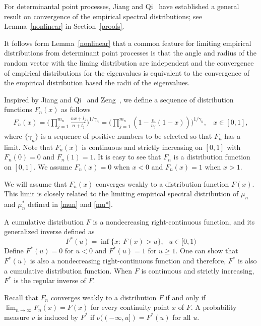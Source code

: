 \documentclass[11pt]{article}
\numberwithin{equation}{section}
\begin{document}
For determinantal point processes, Jiang and Qi~\cite{JiangQi2019}
have established a general result on convergence of the empirical
spectral distributions; see Lemma~\ref{nonlinear} in
Section~\ref{proofs}.

It follows form Lemma~\ref{nonlinear} that a common feature for
limiting empirical distributions from determinant point processes is
that the angle and radius of the random vector with the liming
distribution are independent and the convergence of empirical
distributions for the eigenvalues is equivalent to the convergence
of the empirical distribution based the radii of the eigenvalues.

Inspired by Jiang and Qi~\cite{JiangQi2019} and
Zeng~\cite{Zeng2017}, we define a sequence of distribution functions
$F_n(x)$ as follows
\begin{eqnarray}\label{Fn}
    F_{n}(x)=\Big(\prod_{j=1}^{m_n} \frac{nx+l_{j} }{n+l_{j}}\Big)^{1 / \gamma_{n}}=
    \Big(\prod_{j=1}^{m_n} (1-\frac{n}{n_j}(1-x))\Big) ^{1 /\gamma_{n}},~~~~  x
\in[0,1],
\end{eqnarray}
where $\{\gamma_n\}$ is a sequence of positive numbers to be
selected so that $F_n$ has a limit. Note that $F_n(x)$ is continuous
and strictly increasing on $[0,1]$ with $F_{n}(0)=0$ and
$F_{n}(1)=1$. It is easy to see that $F_n$ is a distribution
function on $[0,1]$.  We assume $F_n(x)=0$ when $x<0$ and $F_n(x)=1$
when $x>1$.

We will assume that $F_n(x)$ converges weakly to a distribution
function $F(x)$. This limit is closely related to the limiting
empirical spectral distribution of $\mu_n$ and $\mu_n^*$ defined in
\eqref{mun} and \eqref{mu*}.


A cumulative distribution $F$ is a nondecreasing right-continuous
function, and its generalized inverse defined as
\begin{equation}\label{G-inverse}
F^*(u)=\inf\{x:~ F(x)>u\}, ~~~u\in [0,1)
\end{equation}
Define $F^*(u)=0$ for $u<0$ and $F^*(u)=1$ for $u\ge 1$. One can
show that $F^*(u)$ is also a nondecreasing right-continuous function
and therefore, $F^*$ is also a cumulative distribution function.
When $F$ is continuous and strictly increasing,  $F^*$ is the
regular inverse of $F$.

Recall that $F_n$ converges weakly to a distribution $F$ if and only
if $\lim_{n\to\infty}F_n(x)=F(x)$ for every continuity point $x$ of
$F$. A  probability measure $v$ is induced by $F^*$ if
$\nu((-\infty, u])=F^*(u)$ for all $u$.
\end{document}
